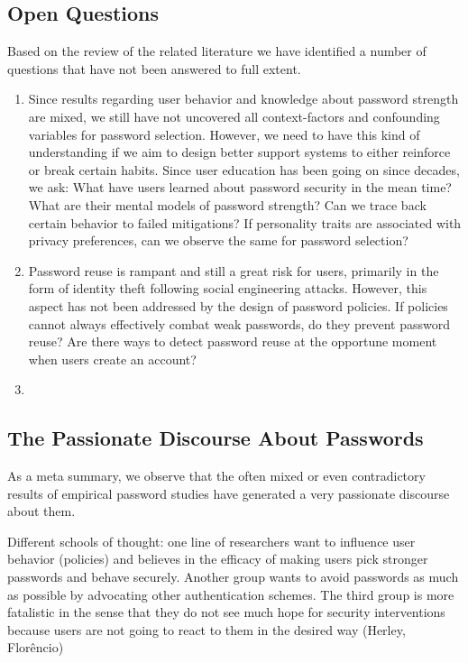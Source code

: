 \subsection*{Open Questions}
Based on the review of the related literature we have identified a number of questions that have not been answered to full extent. 
\begin{enumerate}
	\item Since results regarding user behavior and knowledge about password strength are mixed, we still have not uncovered all context-factors and confounding variables for password selection. However, we need to have this kind of understanding if we aim to design better support systems to either reinforce or break certain habits. Since user education has been going on since decades, we ask: What have users learned about password security in the mean time? What are their mental models of password strength? Can we trace back certain behavior to failed mitigations? If personality traits are associated with privacy preferences, can we observe the same for password selection?
	
	\item Password reuse is rampant and still a great risk for users, primarily in the form of identity theft following social engineering attacks. However, this aspect has not been addressed by the design of password policies. If policies cannot always effectively combat weak passwords, do they prevent password reuse? Are there ways to detect password reuse at the opportune moment when users create an account? 
	
	\item 
\end{enumerate}

\subsection*{The Passionate Discourse About Passwords}\label{sec:rw:passionate_discourse}
As a meta summary, we observe that the often mixed or even contradictory results of empirical password studies have generated a very passionate discourse about them. 

Different schools of thought: one line of researchers want to influence user behavior (policies) and believes in the efficacy of making users pick stronger passwords and behave securely. Another group wants to avoid passwords as much as possible by advocating other authentication schemes. The third group is more fatalistic in the sense that they do not see much hope for security interventions because users are not going to react to them in the desired way (Herley, Florêncio)

